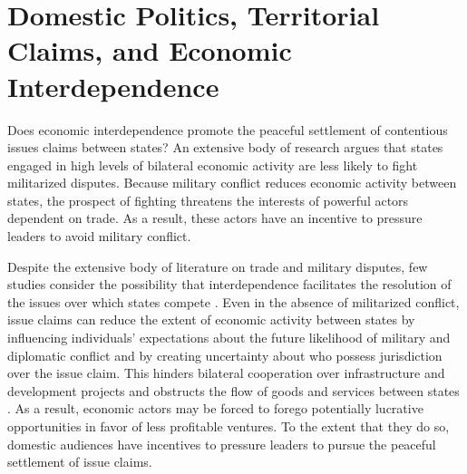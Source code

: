 \begin{comment}
\usepackage{booktabs, tabularx}

\usepackage[backend=bibtex, style=authoryear,sorting=nyt, natbib=true, doi=false,isbn=false,url=false, eprint=false, uniquename=false]{biblatex}

\AtEveryBibitem{%
	\clearfield{note}%
	\clearlist{language}%
}
\renewbibmacro{in:}{%
	\ifentrytype{article}{}{\printtext{\bibstring{in}\intitlepunct}}}
\renewbibmacro*{volume+number+eid}{%
	\printfield{volume}%
	\setunit*{\addnbspace}
	\printfield{number}%
	\setunit{\addcomma\space}%
	\printfield{eid}}
\DeclareFieldFormat[article]{number}{\mkbibparens{#1}}

\usepackage{titling}
\title{Domestic Politics, Territorial Claims, and Economic Interdependence}
\author{George Williford\\The University of Georgia}


	\end{comment}
	
\chapter{Domestic Politics, Territorial Claims, and Economic Interdependence}


Does economic interdependence promote the peaceful settlement of contentious issues claims between states? An extensive body of research argues that states engaged in high levels of bilateral economic activity are less likely to fight militarized disputes. Because military conflict reduces economic activity between states, the prospect of fighting threatens the interests of powerful actors dependent on trade.
As a result, these actors have an incentive to pressure leaders to avoid military conflict. 


Despite the extensive body of literature on trade and military disputes, few studies consider the possibility that interdependence facilitates the resolution of the issues over which states compete \citep[exceptions include][]{lee2012, schultz2015}. Even in the absence of militarized conflict, issue claims can reduce the extent of economic activity between states by influencing individuals’ expectations about the future likelihood of military and diplomatic conflict and by creating uncertainty about who possess jurisdiction over the issue claim. This hinders bilateral cooperation over infrastructure and development projects and obstructs the flow of goods and services between states \citep[e.g.][]{carter2018, simmons2005}. As a result, economic actors may be forced to forego potentially lucrative opportunities in favor of less profitable ventures. To the extent that they do so, domestic audiences have incentives to pressure leaders to pursue the peaceful settlement of issue claims.

